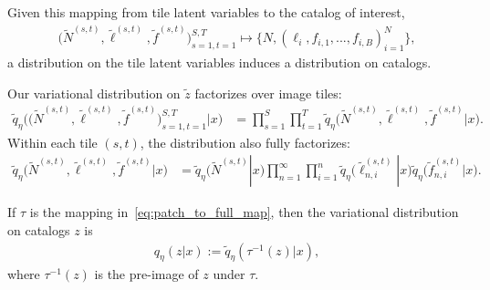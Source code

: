 Given this mapping from tile latent variables to the catalog of interest, 
\begin{align}
 \big(\tilde N^{(s, t)}, \tilde \ell^{(s, t)}, \tilde f^{(s, t)}\big)_{s=1, t = 1}^{S, T}
\mapsto     
\{N, (\ell_i, f_{i,1}, ..., f_{i,B})_{i = 1}^N\},
\label{eq:patch_to_full_map}
\end{align}
a distribution on the tile latent variables induces a distribution on catalogs. 

Our variational distribution on $\tilde z$ factorizes over image tiles:
\begin{align}
    \tilde q_\eta\big( \big(\tilde N^{(s, t)}, \tilde \ell^{(s, t)}, \tilde f^{(s, t)}\big)_{s=1, t = 1}^{S, T}|x\big) 
    &=
    \prod_{s = 1}^S \prod_{t=1}^T
    \tilde q_\eta\big(\tilde N^{(s, t)}, \tilde \ell^{(s, t)}, \tilde f^{(s, t)} | x\big).
    \label{eq:factorize_patches}
\end{align}
Within each tile $(s,t)$, the distribution also fully factorizes: 
\begin{align}
    \tilde q_\eta\big(\tilde N^{(s, t)}, \tilde \ell^{(s, t)}, \tilde f^{(s, t)} | x\big)
    &= 
    \tilde q_\eta\big(\tilde N^{(s, t)} | x\big)
    \prod_{n = 1}^\infty \prod_{i = 1}^n 
    \tilde q_\eta\big(\tilde \ell_{n,i}^{(s, t)} | x\big)
    \tilde q_\eta\big(\tilde f_{n,i}^{(s, t)} | x\big).
    \label{eq:factorize_within_patch}
\end{align}

If $\tau$ is the mapping in~\eqref{eq:patch_to_full_map}, then the variational distribution on catalogs $z$ is
\begin{align}
    q_\eta(z | x) := \tilde q_\eta(\tau^{-1}(z) | x),
    \label{eq:pull_back_of_q}
\end{align}
where $\tau^{-1}(z)$ is the pre-image of $z$ under $\tau$.







